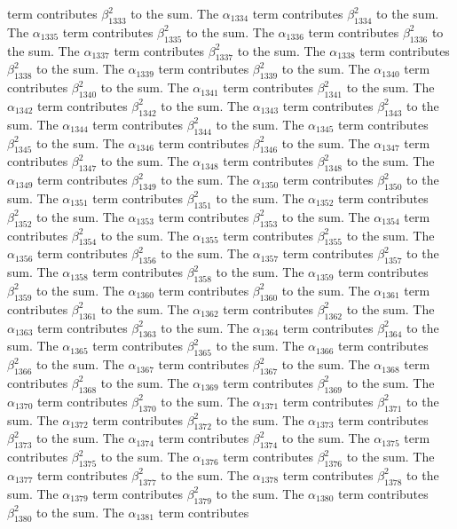 \begin{lemma}
term contributes $\beta_{1333}^{2}$ to the sum. The $\alpha_{1334}$ term contributes $\beta_{1334}^{2}$ to the sum. The $\alpha_{1335}$ term contributes $\beta_{1335}^{2}$ to the sum. The $\alpha_{1336}$ term contributes $\beta_{1336}^{2}$ to the sum. The $\alpha_{1337}$ term contributes $\beta_{1337}^{2}$ to the sum. The $\alpha_{1338}$ term contributes $\beta_{1338}^{2}$ to the sum. The $\alpha_{1339}$ term contributes $\beta_{1339}^{2}$ to the sum. The $\alpha_{1340}$ term contributes $\beta_{1340}^{2}$ to the sum. The $\alpha_{1341}$ term contributes $\beta_{1341}^{2}$ to the sum. The $\alpha_{1342}$ term contributes $\beta_{1342}^{2}$ to the sum. The $\alpha_{1343}$ term contributes $\beta_{1343}^{2}$ to the sum. The $\alpha_{1344}$ term contributes $\beta_{1344}^{2}$ to the sum. The $\alpha_{1345}$ term contributes $\beta_{1345}^{2}$ to the sum. The $\alpha_{1346}$ term contributes $\beta_{1346}^{2}$ to the sum. The $\alpha_{1347}$ term contributes $\beta_{1347}^{2}$ to the sum. The $\alpha_{1348}$ term contributes $\beta_{1348}^{2}$ to the sum. The $\alpha_{1349}$ term contributes $\beta_{1349}^{2}$ to the sum. The $\alpha_{1350}$ term contributes $\beta_{1350}^{2}$ to the sum. The $\alpha_{1351}$ term contributes $\beta_{1351}^{2}$ to the sum. The $\alpha_{1352}$ term contributes $\beta_{1352}^{2}$ to the sum. The $\alpha_{1353}$ term contributes $\beta_{1353}^{2}$ to the sum. The $\alpha_{1354}$ term contributes $\beta_{1354}^{2}$ to the sum. The $\alpha_{1355}$ term contributes $\beta_{1355}^{2}$ to the sum. The $\alpha_{1356}$ term contributes $\beta_{1356}^{2}$ to the sum. The $\alpha_{1357}$ term contributes $\beta_{1357}^{2}$ to the sum. The $\alpha_{1358}$ term contributes $\beta_{1358}^{2}$ to the sum. The $\alpha_{1359}$ term contributes $\beta_{1359}^{2}$ to the sum. The $\alpha_{1360}$ term contributes $\beta_{1360}^{2}$ to the sum. The $\alpha_{1361}$ term contributes $\beta_{1361}^{2}$ to the sum. The $\alpha_{1362}$ term contributes $\beta_{1362}^{2}$ to the sum. The $\alpha_{1363}$ term contributes $\beta_{1363}^{2}$ to the sum. The $\alpha_{1364}$ term contributes $\beta_{1364}^{2}$ to the sum. The $\alpha_{1365}$ term contributes $\beta_{1365}^{2}$ to the sum. The $\alpha_{1366}$ term contributes $\beta_{1366}^{2}$ to the sum. The $\alpha_{1367}$ term contributes $\beta_{1367}^{2}$ to the sum. The $\alpha_{1368}$ term contributes $\beta_{1368}^{2}$ to the sum. The $\alpha_{1369}$ term contributes $\beta_{1369}^{2}$ to the sum. The $\alpha_{1370}$ term contributes $\beta_{1370}^{2}$ to the sum. The $\alpha_{1371}$ term contributes $\beta_{1371}^{2}$ to the sum. The $\alpha_{1372}$ term contributes $\beta_{1372}^{2}$ to the sum. The $\alpha_{1373}$ term contributes $\beta_{1373}^{2}$ to the sum. The $\alpha_{1374}$ term contributes $\beta_{1374}^{2}$ to the sum. The $\alpha_{1375}$ term contributes $\beta_{1375}^{2}$ to the sum. The $\alpha_{1376}$ term contributes $\beta_{1376}^{2}$ to the sum. The $\alpha_{1377}$ term contributes $\beta_{1377}^{2}$ to the sum. The $\alpha_{1378}$ term contributes $\beta_{1378}^{2}$ to the sum. The $\alpha_{1379}$ term contributes $\beta_{1379}^{2}$ to the sum. The $\alpha_{1380}$ term contributes $\beta_{1380}^{2}$ to the sum. The $\alpha_{1381}$ term contributes 
\end{lemma}
